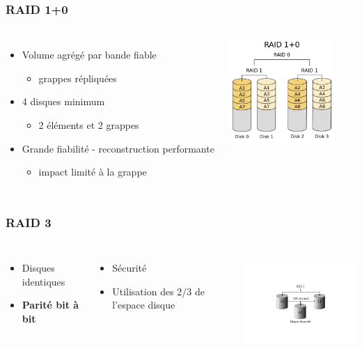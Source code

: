 \begin{frame}
\frametitle{RAID 1+0}
\begin{columns}
  \begin{itemize}
    \item Volume agrégé par bande fiable
    \begin{itemize}
      \item grappes répliquées
    \end{itemize}
    \item 4 disques minimum
    \begin{itemize}
      \item 2 éléments et 2 grappes
    \end{itemize}
    \item Grande fiabilité - reconstruction performante
    \begin{itemize}
      \item impact limité à la grappe
    \end{itemize}
  \end{itemize}
  \includegraphics[height=4cm]{../illustration/RAID10.png}
\end{columns}


\end{frame}




\begin{frame}
\frametitle{RAID 3}
\begin{columns}
\begin{itemize}
\item Disques identiques
\item \textbf{Parité bit à bit}
\end{itemize}
\begin{itemize}
\item Sécurité
\item Utilisation des 2/3 de l’espace disque
\end{itemize}
\includegraphics[height=4cm]{../illustration/RAID3.pdf}
\end{columns}
\end{frame}


